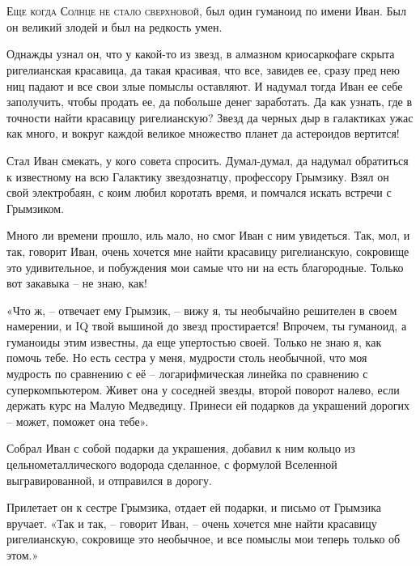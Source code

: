 \documentclass[ebook,oneside,final,openright]{memoir}
\begin{document}
\chapter{}
 \lettrine{Е}{ще когда Солнце не стало сверхновой,} был один гуманоид по имени Иван. Был он великий злодей и был на редкость умен.\par
\par
Однажды узнал он, что у какой-то из звезд, в алмазном криосаркофаге скрыта ригелианская красавица, да такая красивая, что все, завидев ее, сразу пред нею ниц падают и все свои злые помыслы оставляют. И надумал тогда Иван ее себе заполучить, чтобы продать ее, да побольше денег заработать. Да как узнать, где в точности найти красавицу ригелианскую? Звезд да черных дыр в галактиках ужас как много, и вокруг каждой великое множество планет да астероидов вертится!\par
\par
Стал Иван смекать, у кого совета спросить. Думал-думал, да надумал обратиться к известному на всю Галактику звездознатцу, профессору Грымзику. Взял он свой электробаян, с коим любил коротать время, и помчался искать встречи с Грымзиком.\par
\par
Много ли времени прошло, иль мало, но смог Иван с ним увидеться. Так, мол, и так, говорит Иван, очень хочется мне найти красавицу ригелианскую, сокровище это удивительное, и побуждения мои самые что ни на есть благородные. Только вот закавыка – не знаю, как!\par
\par
«Что ж, – отвечает ему Грымзик, – вижу я, ты необычайно решителен в своем намерении, и IQ твой вышиной до звезд простирается! Впрочем, ты гуманоид, а гуманоиды этим известны, да еще упертостью своей. Только не знаю я, как помочь тебе. Но есть сестра у меня, мудрости столь необычной, что моя мудрость по сравнению с её – логарифмическая линейка по сравнению с суперкомпьютером. Живет она у соседней звезды, второй поворот налево, если держать курс на Малую Медведицу. Принеси ей подарков да украшений дорогих – может, поможет она тебе».\par
\par
Собрал Иван с собой подарки да украшения, добавил к ним кольцо из цельнометаллического водорода сделанное, с формулой Вселенной выгравированной, и отправился в дорогу.\par
\par
Прилетает он к сестре Грымзика, отдает ей подарки, и письмо от Грымзика вручает. «Так и так, – говорит Иван, – очень хочется мне найти красавицу ригелианскую, сокровище это необычное, и все помыслы мои теперь только об этом.»\par
\end{document}
